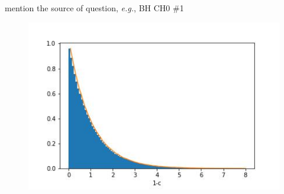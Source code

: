 \documentclass{article}
\begin{document}
\begin{homeworkProblem}{{\color{blue}mention the source of question}, \textit{e.g.}, BH CH0 \#1}
\begin{enumerate}[(a)]
	\begin{figure}[htbp]
		\includegraphics[width=\linewidth]{1-c.jpg}
	\end{figure}
\end{enumerate}
\end{homeworkProblem}
\newpage
\end{document}
